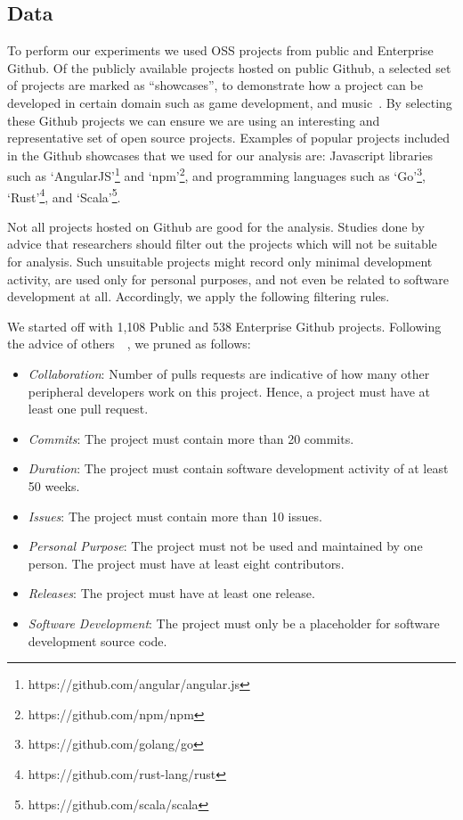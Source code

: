 \documentclass[sigconf]{acmart}
\newcommand{\bi}{\begin{itemize}[leftmargin=0.4cm]}
\newcommand{\ei}{\end{itemize}}
\theoremstyle{break}
\begin{document}
\subsection{Data}
\label{sec:data}

To perform our experiments we used OSS projects from public and Enterprise Github. Of the publicly available projects hosted on public Github, a selected set of projects are marked as ``showcases'', to demonstrate how a project can be developed in certain domain such as game development, and music~\cite{gh:showcase}. 
By selecting these Github projects we can ensure we are using  an interesting and representative set of open source projects. Examples of popular projects included in the Github showcases that we used for our analysis are: Javascript libraries such as `AngularJS'\footnote{https://github.com/angular/angular.js} and `npm'\footnote{https://github.com/npm/npm}, and programming languages such as `Go'\footnote{https://github.com/golang/go}, `Rust'\footnote{https://github.com/rust-lang/rust}, and `Scala'\footnote{https://github.com/scala/scala}.

Not all projects hosted on Github are good for the analysis. Studies done by~\cite{kalliamvakou2014promises,bird2009promises,MunaiahCuration2017}
advice that researchers should filter out the projects which will not be suitable for  analysis. Such unsuitable projects might record only
minimal   development activity, are used only for personal purposes, and not even be related to software development at all. Accordingly,
we apply the following filtering rules.

We started off with 1,108  Public and 538 Enterprise Github projects. Following
the advice of others~\cite{kalliamvakou2014promises}~\cite{bird2009promises}, we pruned  as
follows:

\bi
\item{\textit{Collaboration}: Number of pulls requests are indicative of how many other peripheral developers work on this project. Hence, a project must have at least one pull request.}
\item{\textit{Commits}: The project must contain more than 20 commits.}
\item{\textit{Duration}: The project must contain software development activity of at least 50 weeks.}
\item{\textit{Issues}: The project must contain more than 10 issues.}
\item{\textit{Personal Purpose}: The project must not be used and maintained by one person. The project must have at least eight contributors.}
\item{\textit{Releases}: The project must have at least one release.}
\item{\textit{Software Development}: The project must only be a placeholder for software development source code.}
\ei
\end{document}
